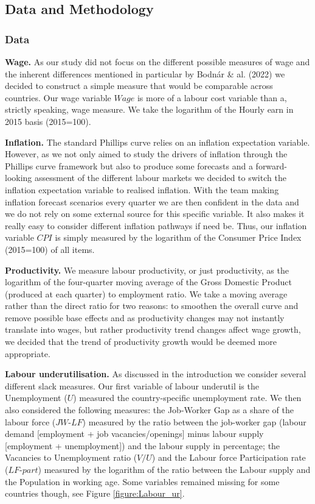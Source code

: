 \subsection{Data and Methodology}
\subsubsection{Data}

\quad \textbf{Wage.} As our study did not focus on the different possible measures of wage and the inherent differences mentioned in particular by Bodnár \& al. (2022) we decided to construct a simple measure that would be comparable across countries. 
Our wage variable $Wage$ is more of a labour cost variable than a, strictly speaking, wage measure. We take the logarithm of the Hourly earn in 2015 basis (2015=100). 

\textbf{Inflation.} The standard Phillips curve relies on an inflation expectation variable. 
However, as we not only aimed to study the drivers of inflation through the Phillips curve framework but also to produce some forecasts and a forward-looking assessment of the different labour markets we decided to switch the inflation expectation variable to realised inflation. 
With the team making inflation forecast scenarios every quarter we are then confident in the data and we do not rely on some external source for this specific variable. 
It also makes it really easy to consider different inflation pathways if need be. 
Thus, our inflation variable $CPI$ is simply measured by the logarithm of the Consumer Price Index (2015=100) of all items.

\textbf{Productivity.} We measure labour productivity, or just productivity, as the logarithm of the four-quarter moving average of the Gross Domestic Product (produced at each quarter) to employment ratio. 
We take a moving average rather than the direct ratio for two reasons: to smoothen the overall curve and remove possible base effects and as productivity changes may not instantly translate into wages, but rather productivity trend changes affect wage growth, we decided that the trend of productivity growth would be deemed more appropriate.

\textbf{Labour underutilisation.} As discussed in the introduction we consider several different slack measures. 
Our first variable of labour underutil is the Unemployment ($U$) measured the country-specific unemployment rate. 
We then also considered the following measures: the Job-Worker Gap as a share of the labour force ($JW\textrm{-}LF$) measured by the ratio between the job-worker gap (labour demand [employment + job vacancies/openings] minus labour supply [employment + unemployment]) and the labour supply in percentage; the Vacancies to Unemployment ratio ($V/U$) and the Labour force Participation rate ($LF\textrm{-}part$) measured by the logarithm of the ratio between the Labour supply and the Population in working age.
Some variables remained missing for some countries though, see Figure \ref{figure:Labour_ur}.

